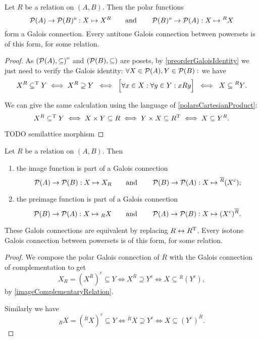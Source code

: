 \begin{proposition} \label{polarsGaloisConnection}
Let $R$ be a relation on $(A,B)$. Then the polar functions
\[ \operatorname{\mathcal{P}}(A)\to\operatorname{\mathcal{P}}(B)^o: X\mapsto X^R \qquad\text{and}\qquad \operatorname{\mathcal{P}}(B)^o\to\operatorname{\mathcal{P}}(A): X\mapsto {^RX} \]
form a Galois connection. Every antitone Galois connection between powersets is of this form, for some relation.
\end{proposition}
\begin{proof}
As $\sSet{\powerset(A), \subseteq}^o$ and $\sSet{\powerset(B), \subseteq}$ are posets, by \ref{preorderGaloisIdentity} we just need to verify the Galois identity: $\forall X\in \operatorname{\mathcal{P}}(A), Y\in\operatorname{\mathcal{P}}(B):$ we have
\[ X^R \subseteq^{\mathrm{T}} Y \iff X^R \supseteq Y \;\iff\; \Big[ \forall x\in X: \forall y\in Y: xRy \Big] \;\iff\; X \subseteq {^RY}. \]

We can give the same calculation using the language of \ref{polarsCartesianProduct}:
\[ X^R \subseteq^{\mathrm{T}} Y \iff X\times Y \subseteq R \iff Y\times X \subseteq R^{\mathrm{T}} \iff X \subseteq Y^R. \]

TODO semilattice morphism
\end{proof}
\begin{proposition} \label{imagePreimageGaloisConnection}
Let $R$ be a relation on $(A, B)$. Then
\begin{enumerate}
\item the image function is part of a Galois connection
\[ \operatorname{\mathcal{P}}(A)\to\operatorname{\mathcal{P}}(B): X\mapsto X_R \qquad\text{and}\qquad \operatorname{\mathcal{P}}(B)\to\operatorname{\mathcal{P}}(A): X\mapsto {^{\overline{R}}(X^c)}; \]
\item the preimage function is part of a Galois connection
\[ \operatorname{\mathcal{P}}(B)\to\operatorname{\mathcal{P}}(A): X\mapsto {_RX} \qquad\text{and}\qquad \operatorname{\mathcal{P}}(A)\to\operatorname{\mathcal{P}}(B): X\mapsto (X^c)^{\overline{R}}. \]
\end{enumerate}
These Galois connections are equivalent by replacing $R \leftrightarrow R^{\mathrm{T}}$. Every isotone Galois connection between powersets is of this form, for some relation.
\end{proposition}
\begin{proof}
We compose the polar Galois connection of $\overline{R}$ with the Galois connection of complementation to get
\[ X_R = (X^{\overline{R}})^c \subseteq Y \iff X^{\overline{R}} \supseteq Y^c \iff X \subseteq {^{\overline{R}}(Y^c)}, \]
by \ref{imageComplementaryRelation}.

Similarly we have
\[ {_RX} = ({^{\overline{R}}X})^c \subseteq Y \iff {^{\overline{R}}}X \supseteq Y^c \iff X \subseteq (Y^c)^{\overline{R}}. \]
\end{proof}
